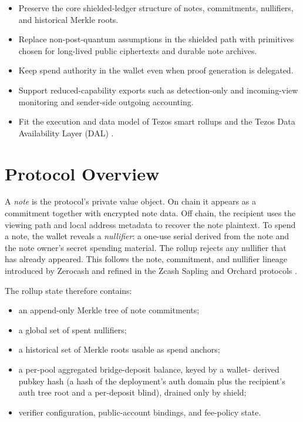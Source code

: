\documentclass[11pt]{article}
\begin{document}
\begin{itemize}
  \item Preserve the core shielded-ledger structure of notes, commitments,
        nullifiers, and historical Merkle roots.
  \item Replace non-post-quantum assumptions in the shielded path with
        primitives chosen for long-lived public ciphertexts and durable note
        archives.
  \item Keep spend authority in the wallet even when proof generation is
        delegated.
  \item Support reduced-capability exports such as detection-only and
        incoming-view monitoring and sender-side outgoing accounting.
  \item Fit the execution and data model of Tezos smart rollups and the Tezos
        Data Availability Layer (DAL) \cite{tezos-smart-rollups,tezos-dal}.
\end{itemize}

\section{Protocol Overview}

A \emph{note} is the protocol's private value object. On chain it appears as a
commitment together with encrypted note data. Off chain, the recipient uses the
viewing path and local address metadata to recover the note plaintext. To spend
a note, the wallet reveals a \emph{nullifier}: a one-use serial derived from
the note and the note owner's secret spending material. The rollup rejects any
nullifier that has already appeared. This follows the note, commitment, and
nullifier lineage introduced by Zerocash and refined in the Zcash Sapling and
Orchard protocols \cite{zerocash,zcash-protocol,zcash-orchard}.

The rollup state therefore contains:

\begin{itemize}
  \item an append-only Merkle tree of note commitments;
  \item a global set of spent nullifiers;
  \item a historical set of Merkle roots usable as spend anchors;
  \item a per-pool aggregated bridge-deposit balance, keyed by a wallet-
        derived pubkey hash (a hash of the deployment's auth domain plus
        the recipient's auth tree root and a per-deposit blind), drained
        only by shield;
  \item verifier configuration, public-account bindings, and fee-policy state.
\end{itemize}
\end{document}
